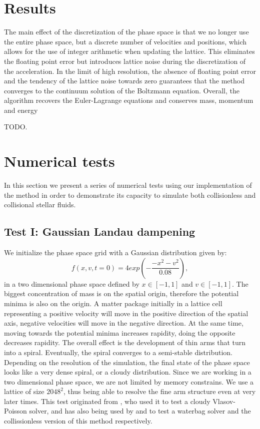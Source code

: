 \documentclass[fleqn,usenatbib]{mnras}
\begin{document}
\section{Results}
The main effect of the discretization of the phase space is that we no longer use the entire phase space, but a discrete number of velocities and positions, which allows for the use of integer arithmetic when updating the lattice. This eliminates the floating point error but introduces lattice noise during the discretization of the acceleration. In the limit of high resolution, the absence of floating point error and the tendency of the lattice noise towards zero guarantees that the method converges to the continuum solution of the Boltzmann equation. Overall, the algorithm recovers the Euler-Lagrange equations and conserves mass, momentum and energy

TODO.

\section{Numerical tests}
In this section we present a series of numerical tests using our implementation of the method in order to demonstrate its capacity to simulate both collisionless and collisional stellar fluids.   

\subsection{Test I: Gaussian Landau dampening}
\label{sec: test_gauss}
We initialize the phase space grid with a Gaussian distribution given by:
\begin{equation}
f(x,v,t = 0) = 4 exp(-\frac{-x^2-v^2}{0.08}),
\end{equation} 
in a two dimensional phase space defined by $x \in [-1,1]$ and $v \in [-1,1]$.
The biggest concentration of mass is on the spatial origin, therefore the potential minima is also on the origin.
A matter package initially in a lattice cell representing a positive velocity will move in the positive direction of the spatial axis, negative velocities will move in the negative direction.
At the same time, moving towards the potential minima increases rapidity, doing the opposite decreases rapidity.
The overall effect is the development of thin arms that turn into a spiral. Eventually, the spiral converges to a semi-stable distribution. Depending on the resolution of the simulation, the final state of the phase space looks like a very dense spiral, or a cloudy distribution.
Since we are working in a two dimensional phase space, we are not limited by memory constrains. We use a lattice of size $2048^2$, thus being able to resolve the fine arm structure even at very later times.
This test originated from \citet{2005MNRAS.359..123A}, who used it to test a cloudy Vlasov-Poisson solver, and has also being used by \citet{2014MNRAS.441.2414C} and \citet{integerLatticeDynamics} to test a waterbag solver and the collissionless version of this method respectively.
\end{document}
